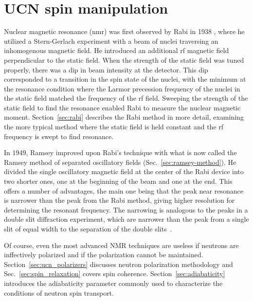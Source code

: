 
\chapter{UCN spin manipulation}\label{chap:spinManipulation}


Nuclear magnetic resonance (\acrshort*{nmr}) was first observed by Rabi in 1938 \cite{rabi_1938}, where he utilized a Stern-Gerlach experiment with a beam of nuclei traversing an inhomogenous magnetic field. He introduced an additional \acrshort{rf} magnetic field perpendicular to the static field. When the strength of the static field was tuned properly, there was a dip in beam intensity at the detector. This dip corresponded to a transition in the spin state of the nuclei, with the minimum at the resonance condition where the Larmor precession frequency of the nuclei in the static field matched the frequency of the \acrshort*{rf} field. Sweeping the strength of the static field to find the resonance enabled Rabi to measure the nuclear magnetic moment. Section~\ref{sec:rabi} describes the Rabi method in more detail, examining the more typical method where the static field is held constant and the \acrshort{rf} frequency is swept to find resonance.

In 1949, Ramsey \cite{ramsey_molecular_1950} improved upon Rabi's technique with what is now called the Ramsey method of separated oscillatory fields (Sec.~\ref{sec:ramsey-method}).  He divided the single oscillatory magnetic field at the center of the Rabi device into two shorter ones, one at the beginning of the beam and one at the end. This offers a number of advantages, the main one being that the peak near resonance is narrower than the peak from the Rabi method, giving higher resolution for determining the resonant frequency. The narrowing is analogous to the peaks in a double slit diffraction experiment, which are narrower than the peak from a single slit of equal width to the separation of the double slits~\cite{Ekspong1993}.

Of course, even the most advanced NMR techniques are useless if neutrons are inffectively polarized and if the polarization cannot be maintained. Section~\ref{sec:ucn_polarizers} discusses neutron polarization methodology and Sec.~\ref{sec:spin_relaxation} covers spin coherence. Section~\ref{sec:adiabaticity} introduces the adiabaticity parameter commonly used to characterize the conditions of neutron spin transport.


